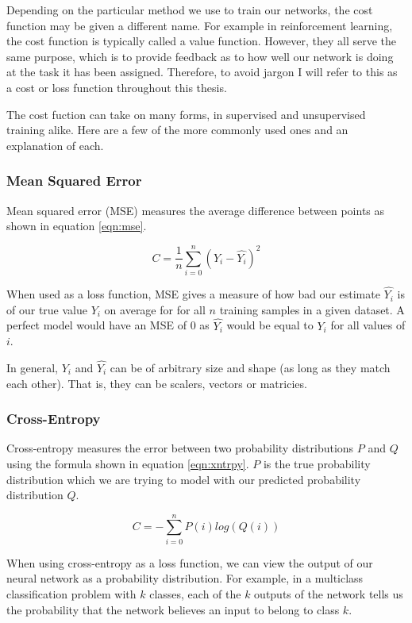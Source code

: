Depending on the particular method we use to train our networks, the cost function may be given a different name. For example in reinforcement learning, the cost function is typically called a value function. However, they all serve the same purpose, which is to provide feedback as to how well our network is doing at the task it has been assigned. Therefore, to avoid jargon I will refer to this as a cost or loss function throughout this thesis.

The cost fuction can take on many forms, in supervised and unsupervised training alike. Here are a few of the more commonly used ones and an explanation of each.

\subsubsection{Mean Squared Error}
Mean squared error (MSE) measures the average difference between points as shown in equation \ref{eqn:mse}.

\begin{equation}
C = \frac{1}{n}\sum_{i=0}^{n} (Y_i - \hat{Y_i})^2
\label{eqn:mse}
\end{equation}

When used as a loss function, MSE gives a measure of how bad our estimate $\hat{Y_i}$ is of our true value $Y_i$ on average for for all $n$ training samples in a given dataset. A perfect model would have an MSE of 0 as $\hat{Y_i}$ would be equal to $Y_i$ for all values of $i$.

In general, $Y_i$ and $\hat{Y_i}$ can be of arbitrary size and shape (as long as they match each other). That is, they can be scalers, vectors or matricies.

\subsubsection{Cross-Entropy}
Cross-entropy measures the error between two probability distributions $P$ and $Q$ using the formula shown in equation \ref{eqn:xntrpy}. $P$ is the true probability distribution which we are trying to model with our predicted probability distribution $Q$.

\begin{equation}
C = -\sum_{i=0}^{n}P(i) log(Q(i))
\label{eqn:xentrpy}
\end{equation}

When using cross-entropy as a loss function, we can view the output of our neural network as a probability distribution. For example, in a multiclass classification problem with $k$ classes, each of the $k$ outputs of the network tells us the probability that the network believes an input to belong to class $k$.

